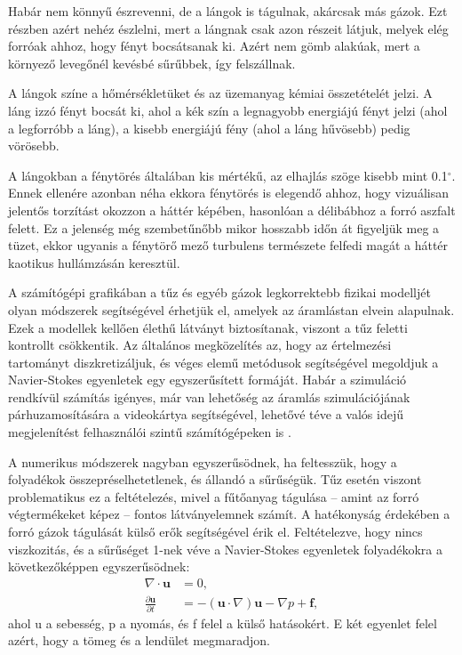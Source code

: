 Habár nem könnyű észrevenni, de a lángok is tágulnak, akárcsak más gázok. Ezt részben azért nehéz észlelni, mert a lángnak csak azon részeit látjuk, melyek elég forróak ahhoz, hogy fényt bocsátsanak ki. Azért nem gömb alakúak, mert a környező levegőnél kevésbé sűrűbbek, így felszállnak.

A lángok színe a hőmérsékletüket és az üzemanyag kémiai összetételét jelzi. A láng izzó fényt bocsát ki, ahol a kék szín a legnagyobb energiájú fényt jelzi (ahol a legforróbb a láng), a kisebb energiájú fény (ahol a láng hűvösebb) pedig vörösebb.

\cite{firePhysics1}

A lángokban a fénytörés általában kis mértékű, az elhajlás szöge kisebb mint 0.1$^{\circ}$. Ennek ellenére azonban néha ekkora fénytörés is elegendő ahhoz, hogy vizuálisan jelentős torzítást okozzon a háttér képében, hasonlóan a délibábhoz a forró aszfalt felett. Ez a jelenség még szembetűnőbb mikor hosszabb időn át figyeljük meg a tüzet, ekkor ugyanis a fénytörő mező turbulens természete felfedi magát a háttér kaotikus hullámzásán keresztül\cite{swhThreeDimensionalReconst}.

A számítógépi grafikában a tűz és egyéb gázok legkorrektebb fizikai modelljét olyan módszerek segítségével érhetjük el, amelyek az áramlástan elvein alapulnak. Ezek a modellek kellően élethű látványt biztosítanak, viszont a tűz feletti kontrollt csökkentik. Az általános megközelítés az, hogy az értelmezési tartományt diszkretizáljuk, és véges elemű metódusok segítségével megoldjuk a Navier-Stokes egyenletek egy egyszerűsített formáját. Habár a szimuláció rendkívül számítás igényes, már van lehetőség az áramlás szimulációjának párhuzamosítására a videokártya segítségével, lehetővé téve a valós idejű megjelenítést felhasználói szintű számítógépeken is \cite{texturedForces}.  
\cite{swhThreeDimensionalReconst}

A numerikus módszerek nagyban egyszerűsödnek, ha feltesszük, hogy a folyadékok összepréselhetetlenek, és állandó a sűrűségük. Tűz esetén viszont problematikus ez a feltételezés, mivel a fűtőanyag tágulása – amint az forró végtermékeket képez – fontos látványelemnek számít. A hatékonyság érdekében a forró gázok tágulását külső erők segítségével érik el. Feltételezve, hogy nincs viszkozitás, és a sűrűséget 1-nek véve a Navier-Stokes egyenletek folyadékokra a következőképpen egyszerűsödnek:
\begin{align*}
\nabla \cdot \textbf{u} &= 0, \\
\frac{\partial \textbf{u}}{\partial t} &= -(\textbf{u} \cdot \nabla)\textbf{u} - \nabla \textit{p} + \textbf{f} , 
\end{align*}
ahol u a sebesség, p a nyomás, és f felel a külső hatásokért. E két egyenlet felel azért, hogy a tömeg és a lendület megmaradjon. 
\cite{swhThreeDimensionalReconst}

